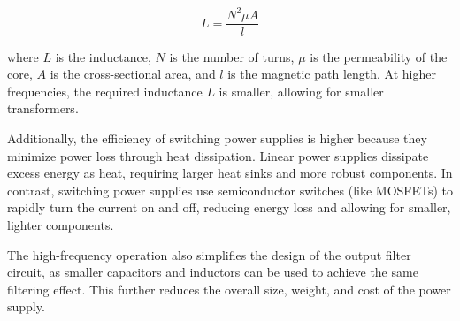 \[
L = \frac{N^2 \mu A}{l}
\]

where \( L \) is the inductance, \( N \) is the number of turns, \( \mu \) is the permeability of the core, \( A \) is the cross-sectional area, and \( l \) is the magnetic path length. At higher frequencies, the required inductance \( L \) is smaller, allowing for smaller transformers.

Additionally, the efficiency of switching power supplies is higher because they minimize power loss through heat dissipation. Linear power supplies dissipate excess energy as heat, requiring larger heat sinks and more robust components. In contrast, switching power supplies use semiconductor switches (like MOSFETs) to rapidly turn the current on and off, reducing energy loss and allowing for smaller, lighter components.

The high-frequency operation also simplifies the design of the output filter circuit, as smaller capacitors and inductors can be used to achieve the same filtering effect. This further reduces the overall size, weight, and cost of the power supply.

